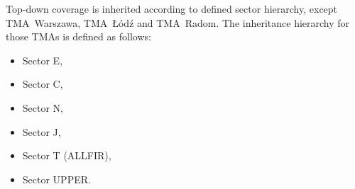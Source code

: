 Top-down coverage is inherited according to defined sector hierarchy, except
TMA~Warszawa, TMA~Łódź and TMA~Radom. The inheritance hierarchy for those TMAs
is defined as follows:
\begin{itemize}
	\item Sector E,
	\item Sector C,
	\item Sector N,
	\item Sector J,
	\item Sector T (ALLFIR),
	\item Sector UPPER.
\end{itemize}

